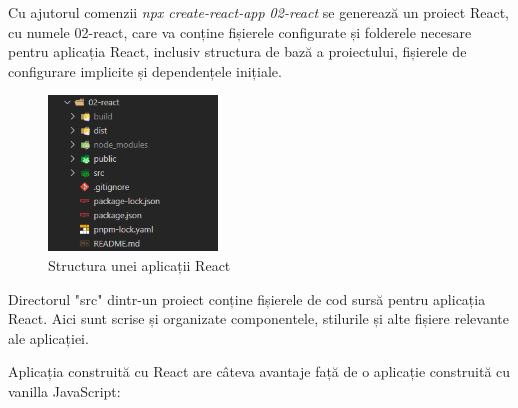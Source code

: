 \documentclass[12pt, a4paper]{report}
\begin{document}
Cu ajutorul comenzii \emph{npx create-react-app 02-react} se generează un proiect React, cu numele 02-react, care va conține fișierele configurate și folderele necesare pentru aplicația React, inclusiv structura de bază a proiectului, fișierele de configurare implicite și dependențele inițiale.

\begin{figure}[htbp]
	\centering
	\includegraphics[width=0.4\textwidth]{react_file_structure.png}
	\caption{Structura unei aplicații React}
	\label{fig:react-structure}
\end{figure}

Directorul "src" dintr-un proiect conține fișierele de cod sursă pentru aplicația React. Aici sunt scrise și organizate componentele, stilurile și alte fișiere relevante ale aplicației.

Aplicația construită cu React are câteva avantaje față de o aplicație construită cu vanilla JavaScript:
\end{document}
